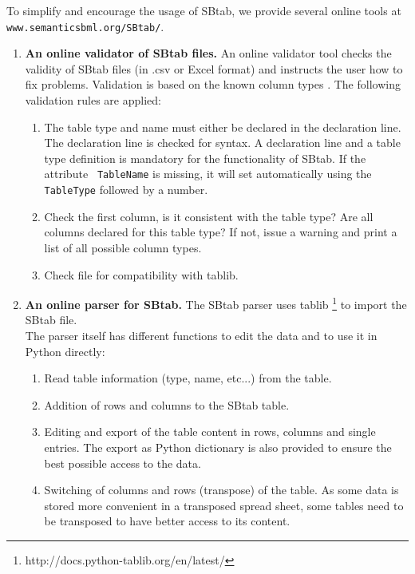 \documentclass[a4paper]{article}
\newcommand{\la}[1]{}
\newcommand{\coout}[1]{}
\newcommand{\tab}[1]{{\texttt{\color{red} #1}}}
\begin{document}
To simplify and encourage the usage of SBtab, we provide several
online tools at \texttt{www.semanticsbml.org/SBtab/}.\coout{They are
  integrated in the collection of online services for SBML models,
  semanticSBML 2.0 (www.semanticsbml.org/semanticSBML), and comprise}
\begin{enumerate} 
\item \textbf{An online validator of SBtab files.} An online validator
  tool checks the validity of SBtab files (in .csv or Excel format)
  and instructs the user how to fix problems.  Validation is based on
  the known column types \la{(predefined declaration table accessible
    for each SBtab version and/or column table in the SBtab
    document)}.  The following validation rules are applied:
\begin{enumerate}
\item The table type and name must either be declared in the
  declaration line. The declaration line is checked for syntax.
  A declaration line and a table type definition is mandatory for the 
  functionality of SBtab. If the attribute \tab{TableName} is missing, it will
  set automatically using the \tab{TableType} followed by a number.
\item Check the first column, is it consistent with the table type?
  Are all columns declared for this table type? If not, issue a warning and print 
  a list of all possible column types.
\item Check file for compatibility with tablib. 
\end{enumerate}

\item \textbf{An online parser for SBtab.} The SBtab parser uses tablib \footnote{http://docs.python-tablib.org/en/latest/} to import the SBtab file.\\
The parser itself has different functions to edit the data and to use it in 
Python directly:
\begin{enumerate}
\item Read table information (type, name, etc...) from the table.
\item Addition of rows and columns to the SBtab table.
\item Editing and export of the table content in rows, columns and single entries. 
The export as Python dictionary is also provided to ensure the best possible access to the data.
\item Switching of columns and rows (transpose) of the table. As some data is
stored more convenient in a transposed spread sheet, some tables need to be 
transposed to have better access to its content. 
\end{enumerate}


\end{enumerate}
\end{document}

